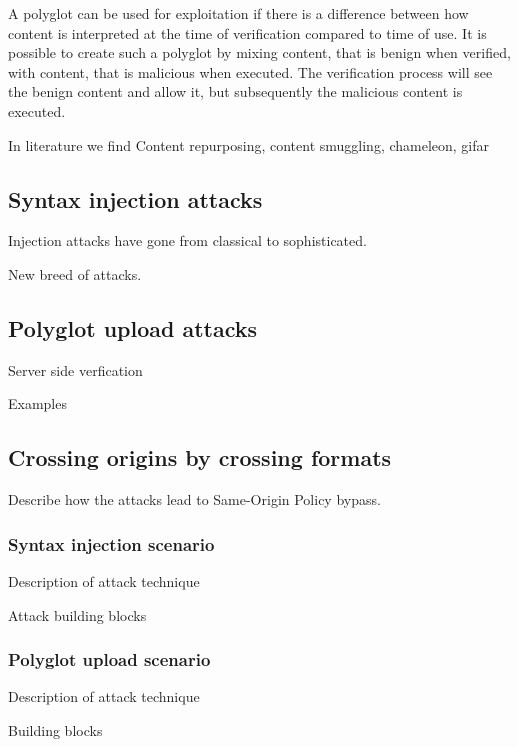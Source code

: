 \documentclass[10pt, conference, compsocconf]{IEEEtran}
\begin{document}
A polyglot can be used for exploitation if there is a difference between how 
content is interpreted at the time of verification compared to time of use. 
It is possible to create such a polyglot by mixing content, that is benign when verified, with content, that is 
malicious when executed. The verification process will see the benign content 
and allow it, but subsequently the malicious content is executed.

In literature we find Content repurposing, content smuggling, chameleon, gifar



\subsection{Syntax injection attacks}

Injection attacks have gone from classical to sophisticated.

New breed of attacks.



\subsection{Polyglot upload attacks}

Server side verfication

Examples



\subsection{Crossing origins by crossing formats}

Describe how the attacks lead to Same-Origin Policy bypass.


\subsubsection{Syntax injection scenario}

Description of attack technique

Attack building blocks


\subsubsection{Polyglot upload scenario}

Description of attack technique

Building blocks
\end{document}
